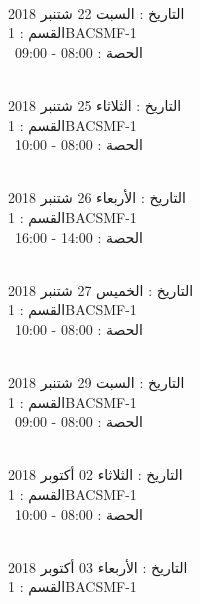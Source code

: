 \documentclass[14pt a4paper twocolumn]{book}
\begin{document}
\noindent\makebox[\linewidth]{\rule{\paperwidth}{0.4pt}}
 \\
التاريخ : السبت 22 شتنبر 2018 \\
القسم : 1BACSMF-1 \\
 \  
الحصة : 08:00 - 09:00 \\
\par
\noindent\makebox[\linewidth]{\rule{\paperwidth}{0.4pt}}
 \\
التاريخ : الثلاثاء 25 شتنبر 2018 \\
القسم : 1BACSMF-1 \\
 \  
الحصة : 08:00 - 10:00 \\
\par
\noindent\makebox[\linewidth]{\rule{\paperwidth}{0.4pt}}
 \\
التاريخ : الأربعاء 26 شتنبر 2018 \\
القسم : 1BACSMF-1 \\
 \  
الحصة : 14:00 - 16:00 \\
\par
\noindent\makebox[\linewidth]{\rule{\paperwidth}{0.4pt}}
 \\
التاريخ : الخميس 27 شتنبر 2018 \\
القسم : 1BACSMF-1 \\
 \  
الحصة : 08:00 - 10:00 \\
\par
\noindent\makebox[\linewidth]{\rule{\paperwidth}{0.4pt}}
 \\
التاريخ : السبت 29 شتنبر 2018 \\
القسم : 1BACSMF-1 \\
 \  
الحصة : 08:00 - 09:00 \\
\par
\noindent\makebox[\linewidth]{\rule{\paperwidth}{0.4pt}}
 \\
التاريخ : الثلاثاء 02 أكتوبر 2018 \\
القسم : 1BACSMF-1 \\
 \  
الحصة : 08:00 - 10:00 \\
\par
\noindent\makebox[\linewidth]{\rule{\paperwidth}{0.4pt}}
 \\
التاريخ : الأربعاء 03 أكتوبر 2018 \\
القسم : 1BACSMF-1 \\
\end{document}
